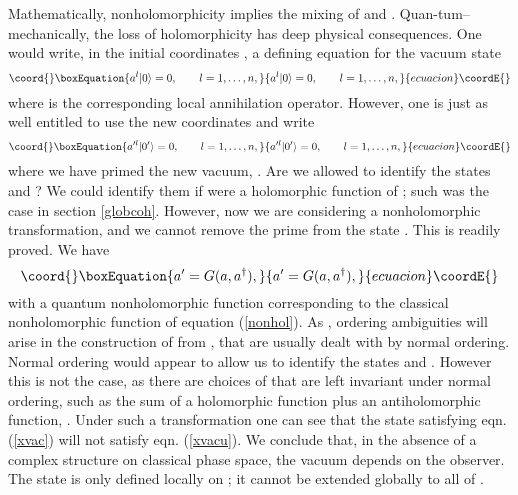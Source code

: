 \documentclass[a4paper,a4paper]{article}
\begin{document}
Mathematically, nonholomorphicity implies the mixing of \coordHE{} and \coordHE{}.
Quan-tum--mechanically, the loss of holomorphicity has deep physical consequences.
One would write, in the initial coordinates \coordHE{}, a defining equation for the vacuum 
state \myHighlight{$|0\rangle$}\coordHE{}
\begin{equation}\coord{}\boxEquation{
a^l|0\rangle =0, \qquad l=1,\ldots, n,
\label{xvac}
}{
a^l|0\rangle =0, \qquad l=1,\ldots, n,
}{ecuacion}\coordE{}\end{equation}
where \coordHE{} is the corresponding local annihilation operator.
However, one is just as well entitled to use the new coordinates \coordHE{}
and write
\begin{equation}\coord{}\boxEquation{
a'^l|0'\rangle =0, \qquad l=1,\ldots, n,
\label{xvacu}
}{
a'^l|0'\rangle =0, \qquad l=1,\ldots, n,
}{ecuacion}\coordE{}\end{equation}
where we have primed the new vacuum, \coordHE{}. 
Are we allowed to identify the states \myHighlight{$|0\rangle$}\coordHE{} and \coordHE{}? 
We could identify them if \coordHE{} were a holomorphic function of \coordHE{}; 
such was the case in section \ref{globcoh}. However, now we are considering 
a nonholomorphic transformation, and we cannot remove the 
prime from the state \coordHE{}. This is readily proved.
We have
\begin{equation}\coord{}\boxEquation{
a'=G(a, a^{\dagger}),
\label{effe}
}{
a'=G(a, a^{\dagger}),
}{ecuacion}\coordE{}\end{equation}
with \coordHE{} a quantum nonholomorphic function corresponding to the classical 
nonholomorphic function \coordHE{} of equation (\ref{nonhol}). As \coordHE{}, 
ordering ambiguities will arise in the construction of \coordHE{} from \coordHE{},
that are usually dealt with by normal ordering. Normal ordering would 
appear to allow us to identify the states \myHighlight{$|0\rangle$}\coordHE{} and \coordHE{}.
However this is not the case, as there are choices of \coordHE{} that are left invariant under 
normal ordering, such as the sum of a holomorphic function plus
an antiholomorphic function, \coordHE{}.
Under such a transformation one can see that the state \myHighlight{$|0\rangle$}\coordHE{} satisfying 
eqn. (\ref{xvac}) will not satisfy eqn. (\ref{xvacu}). 
We conclude that, in the absence of a complex structure 
on classical phase space, the vacuum depends on the observer. 
The state \myHighlight{$|0\rangle$}\coordHE{} is only defined locally on \coordHE{}; it cannot be 
extended globally to all of \coordHE{}. 
\end{document}
